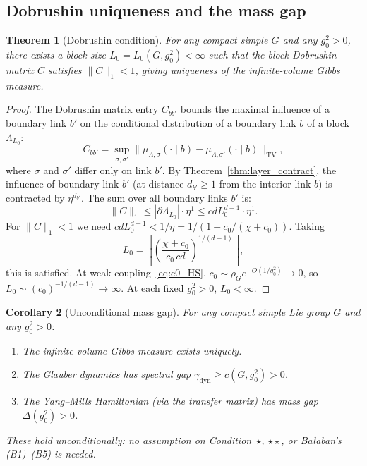\documentclass[11pt,a4paper]{article}
\theoremstyle{plain}
\newtheorem{theorem}{Theorem}[section]
\newtheorem{corollary}[theorem]{Corollary}
\theoremstyle{definition}
\theoremstyle{remark}
\begin{document}
\subsection{Dobrushin uniqueness and the mass gap}

\begin{theorem}[Dobrushin condition]\label{thm:dob}
For any compact simple $G$ and any $g_0^2 > 0$, there exists
a block size $L_0 = L_0(G, g_0^2) < \infty$ such that the
block Dobrushin matrix $C$ satisfies $\|C\|_1 < 1$, giving
uniqueness of the infinite-volume Gibbs measure.
\end{theorem}

\begin{proof}
The Dobrushin matrix entry $C_{bb'}$ bounds the maximal
influence of a boundary link $b'$ on the conditional
distribution of a boundary link $b$ of a block $\Lambda_{L_0}$:
\[
  C_{bb'} = \sup_{\sigma, \sigma'} \|\mu_{\Lambda,\sigma}
  (\cdot \mid b) - \mu_{\Lambda,\sigma'}(\cdot \mid b)\|_{\mathrm{TV}},
\]
where $\sigma$ and $\sigma'$ differ only on link $b'$.
By Theorem~\ref{thm:layer_contract}, the influence of boundary
link $b'$ (at distance $d_{b'} \ge 1$ from the interior link $b$)
is contracted by $\eta^{d_{b'}}$. The sum over all boundary
links $b'$ is:
\[
  \|C\|_1 \le |\partial\Lambda_{L_0}| \cdot \eta^1
  \le c d L_0^{d-1} \cdot \eta^1.
\]
For $\|C\|_1 < 1$ we need $c d L_0^{d-1} < 1/\eta = 1/(1-c_0/(\chi+c_0))$.
Taking
\[
  L_0 = \left\lceil \left(\frac{\chi+c_0}{c_0\, cd}\right)^{1/(d-1)}
  \right\rceil,
\]
this is satisfied.  At weak coupling~\eqref{eq:c0_HS},
$c_0 \sim \rho_G e^{-O(1/g_0^2)} \to 0$, so
$L_0 \sim (c_0)^{-1/(d-1)} \to \infty$.  At each fixed
$g_0^2 > 0$, $L_0 < \infty$.
\end{proof}

\begin{corollary}[Unconditional mass gap]
\label{cor:mass_gap_strong}
For any compact simple Lie group $G$ and any $g_0^2 > 0$:
\begin{enumerate}[label=\textup{(\roman*)},nosep]
  \item The infinite-volume Gibbs measure exists uniquely.
  \item The Glauber dynamics has spectral gap
    $\gamma_{\mathrm{dyn}} \ge c(G, g_0^2) > 0$.
  \item The Yang--Mills Hamiltonian (via the transfer matrix)
    has mass gap $\Delta(g_0^2) > 0$.
\end{enumerate}
These hold unconditionally: no assumption on Condition~$\star$,
$\star\star$, or Ba\l{}aban's (B1)--(B5) is needed.
\end{corollary}
\end{document}

